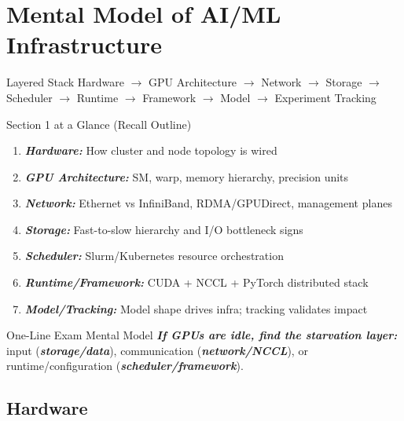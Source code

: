 \documentclass[12pt]{article}
\title{\blue{NVIDIA AI/ML Infrastructure -- Study Review}}
\author{}
\date{}
\let\origtextbf\textbf
\renewcommand{\textbf}[1]{\origtextbf{\textit{#1}}}
\begin{document}
\color{Ink}
\maketitle

\tableofcontents
\newpage

\section{Mental Model of AI/ML Infrastructure}

\begin{bluebox}{Layered Stack}
Hardware $\rightarrow$ GPU Architecture $\rightarrow$ Network $\rightarrow$ Storage $\rightarrow$ Scheduler $\rightarrow$ Runtime $\rightarrow$ Framework $\rightarrow$ Model $\rightarrow$ Experiment Tracking
\end{bluebox}

\begin{greenbox}{Section 1 at a Glance (Recall Outline)}
\begin{enumerate}[leftmargin=1.3em]
\item \textbf{Hardware:} How cluster and node topology is wired
\item \textbf{GPU Architecture:} SM, warp, memory hierarchy, precision units
\item \textbf{Network:} Ethernet vs InfiniBand, RDMA/GPUDirect, management planes
\item \textbf{Storage:} Fast-to-slow hierarchy and I/O bottleneck signs
\item \textbf{Scheduler:} Slurm/Kubernetes resource orchestration
\item \textbf{Runtime/Framework:} CUDA + NCCL + PyTorch distributed stack
\item \textbf{Model/Tracking:} Model shape drives infra; tracking validates impact
\end{enumerate}
\end{greenbox}

\begin{bluebox}{One-Line Exam Mental Model}
\textbf{If GPUs are idle, find the starvation layer:} input (\textbf{storage/data}), communication (\textbf{network/NCCL}), or runtime/configuration (\textbf{scheduler/framework}).
\end{bluebox}

\subsection{Hardware}
\end{document}
